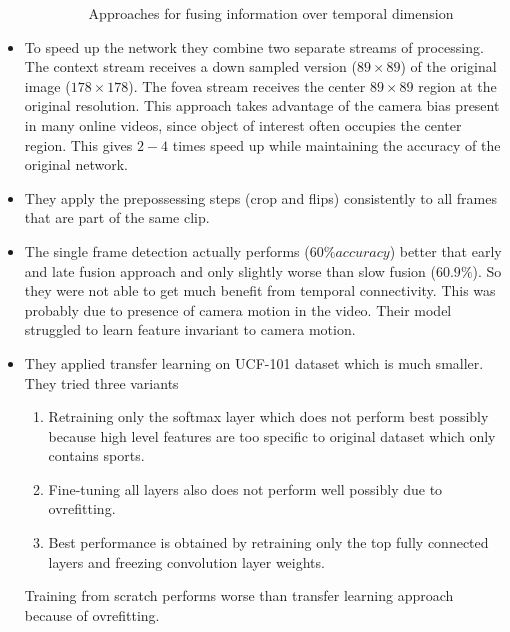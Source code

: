 \documentclass{article}
\begin{document}
\begin{itemize}
\begin{enumerate}
\begin{figure}[H]
            \caption{Approaches for fusing information over temporal dimension}
            \label{fig:Figure 1}
        \end{figure}
    \end{enumerate}
    \item To speed up the network they combine two separate streams of processing. The context stream receives a down sampled version ($89\times 89$) of the original image ($178 \times 178$). The fovea stream receives the center $89\times 89$ region at the original resolution. This approach takes advantage of the camera bias present in many online videos, since object of interest often occupies the center region. This gives $2-4$ times speed up while maintaining the accuracy of the original network.
    \item They apply the prepossessing steps (crop and flips) consistently to all frames that are part of the same clip.
    \item The single frame detection actually performs ($60\% accuracy$) better that early and late fusion approach and only slightly worse than slow fusion ($60.9\%$). So they were not able to get much benefit from temporal connectivity. This was probably due to presence of camera motion in the video. Their model struggled to learn feature invariant to camera motion.
    \item They applied transfer learning on UCF-101 dataset which is much smaller. They tried three variants
    \begin{enumerate}
        \item Retraining only the softmax layer which does not perform best possibly because high level features are too specific to original dataset which only contains sports.
        \item Fine-tuning all layers also does not perform well possibly due to ovrefitting.
        \item Best performance is obtained by retraining only the top fully connected layers and freezing convolution layer weights.
    \end{enumerate}
    Training from scratch performs worse than transfer learning approach because of ovrefitting.
\end{itemize}
\end{document}
